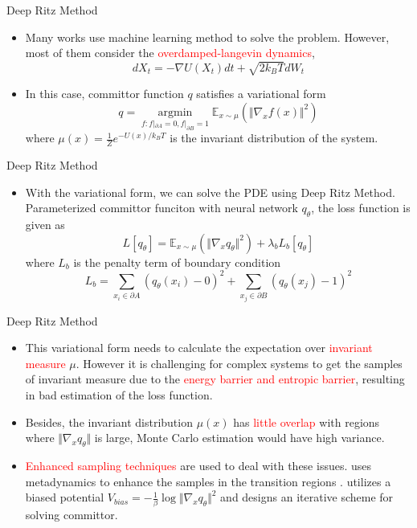 \documentclass{beamer}
\newcommand{\p}{{\partial}}
\newcommand{\kbt}{k_B T}
\newcommand{\rred}{\textcolor{red}}
\begin{document}
\begin{frame}{Deep Ritz Method}
\begin{itemize}
    \item Many works \cite{khoo2019solving,lilinren2019,Kranthi2022,lin2024deep,Kang2024,Trizio2025} use machine learning method to solve the problem. However, most of them consider the \rred{overdamped-langevin dynamics}, 
    $$dX_t = - \nabla U(X_t)dt+\sqrt{2k_B T}dW_t$$
    \item In this case, committor function $q$ satisfies a variational form
    $$q = \operatorname*{argmin}\limits_{f:f|_{\p A}=0,f|_{\p B}=1} \mathbb{E}_{x \sim \mu}(\Vert \nabla_x f(x)\Vert^2)$$
    where $\mu(x) = \frac{1}{Z}e^{-U(x)/\kbt}$ is the invariant distribution of the system.
\end{itemize}
    
\end{frame}


\begin{frame}{Deep Ritz Method}
\begin{itemize}
    \item With the variational form, we can solve the PDE using Deep Ritz Method. Parameterized committor funciton with neural network $q_\theta$,
        the loss function is given as 
        $$L[q_\theta] =\mathbb{E}_{x \sim \mu}(\Vert \nabla_x q_\theta \Vert^2) + \lambda_b L_b[q_\theta] $$ 
        where $L_b$ is the penalty term of boundary condition
        $$L_b = \sum_{x_i \in \p A} (q_\theta(x_i) -0)^2 + \sum_{x_j \in \p B} (q_\theta(x_j) -1)^2$$
\end{itemize}
    
\end{frame}



\begin{frame}{Deep Ritz Method}
\begin{itemize}
    \item This variational form needs to calculate the expectation over \rred{invariant measure} $\mu$. 
    However it is challenging for complex systems to get the samples of invariant measure due to the \rred{energy barrier and entropic barrier}, 
    resulting in bad estimation of the loss function.
    \item Besides, the invariant distribution $\mu(x)$ has \rred{little overlap} with regions where $\Vert \nabla_x q_\theta \Vert$ is large, Monte Carlo
        estimation would have high variance.
    \item \rred{Enhanced sampling techniques} are used to deal with these issues. \cite{lin2024deep} uses metadynamics to enhance the samples in the transition regions
          . \cite{Kang2024} utilizes a biased potential $V_{bias} = -\frac{1}{\beta}\log \Vert \nabla_x q_\theta \Vert^2$ and designs an iterative scheme for solving committor.
    
\end{itemize}
\end{frame}
\end{document}
